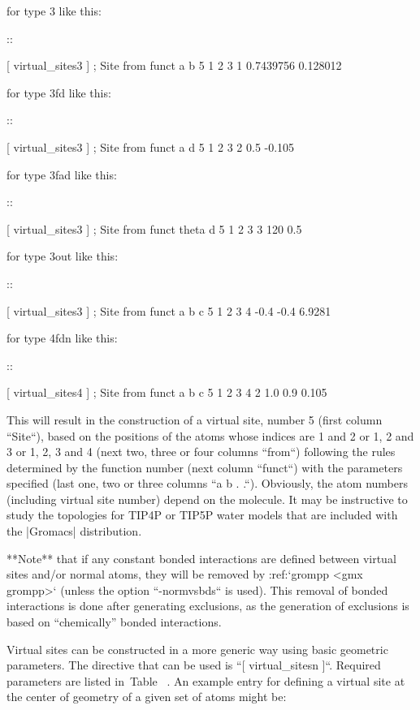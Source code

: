 for type 3 like this:

::

    [ virtual_sites3 ]
    ; Site  from               funct   a          b
    5       1     2     3      1       0.7439756  0.128012

for type 3fd like this:

::

    [ virtual_sites3 ]
    ; Site  from               funct   a          d
    5       1     2     3      2       0.5        -0.105

for type 3fad like this:

::

    [ virtual_sites3 ]
    ; Site  from               funct   theta      d
    5       1     2     3      3       120        0.5

for type 3out like this:

::

    [ virtual_sites3 ]
    ; Site  from               funct   a          b          c
    5       1     2     3      4       -0.4       -0.4       6.9281

for type 4fdn like this:

::

    [ virtual_sites4 ]
    ; Site  from                      funct   a          b          c
    5       1     2     3     4       2       1.0        0.9       0.105

This will result in the construction of a virtual site, number 5 (first
column ``Site``), based on the positions of the atoms
whose indices are 1 and 2 or 1, 2 and 3 or 1, 2, 3 and 4 (next two,
three or four columns ``from``) following the rules
determined by the function number (next column ``funct``)
with the parameters specified (last one, two or three columns
``a b . .``). Obviously, the atom numbers (including
virtual site number) depend on the molecule. It may be instructive to
study the topologies for TIP4P or TIP5P water models that are included
with the |Gromacs| distribution.

**Note** that if any constant bonded interactions are defined between
virtual sites and/or normal atoms, they will be removed by
:ref:`grompp <gmx grompp>` (unless the option ``-normvsbds`` is used). This
removal of bonded interactions is done after generating exclusions, as
the generation of exclusions is based on “chemically” bonded
interactions.

Virtual sites can be constructed in a more generic way using basic
geometric parameters. The directive that can be used is
``[ virtual_sitesn ]``. Required parameters are listed
in Table 
. An example entry for defining
a virtual site at the center of geometry of a given set of atoms might
be:


